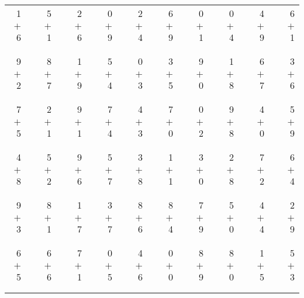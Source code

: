 \documentclass[12pt, letterpaper]{article}
\begin{document}
\begin{tabular}{rrrrrrrrrrrrrrrrrrr}
1 & & 5 & & 2 & & 0 & & 2 & & 6 & & 0 & & 0 & & 4 & & 6\\
$+$ 6 & & $+$ 1 & & $+$ 6 & & $+$ 9 & & $+$ 4 & & $+$ 9 & & $+$ 1 & & $+$ 4 & & $+$ 9 & & $+$ 1\\
\cline{1-1} \cline{3-3} \cline{5-5} \cline{7-7} \cline{9-9} \cline{11-11} \cline{13-13} \cline{15-15} \cline{17-17} \cline{19-19} \\ \\
9 & & 8 & & 1 & & 5 & & 0 & & 3 & & 9 & & 1 & & 6 & & 3\\
$+$ 2 & & $+$ 7 & & $+$ 9 & & $+$ 4 & & $+$ 3 & & $+$ 5 & & $+$ 0 & & $+$ 8 & & $+$ 7 & & $+$ 6\\
\cline{1-1} \cline{3-3} \cline{5-5} \cline{7-7} \cline{9-9} \cline{11-11} \cline{13-13} \cline{15-15} \cline{17-17} \cline{19-19} \\ \\
7 & & 2 & & 9 & & 7 & & 4 & & 7 & & 0 & & 9 & & 4 & & 5\\
$+$ 5 & & $+$ 1 & & $+$ 1 & & $+$ 4 & & $+$ 3 & & $+$ 0 & & $+$ 2 & & $+$ 8 & & $+$ 0 & & $+$ 9\\
\cline{1-1} \cline{3-3} \cline{5-5} \cline{7-7} \cline{9-9} \cline{11-11} \cline{13-13} \cline{15-15} \cline{17-17} \cline{19-19} \\ \\
4 & & 5 & & 9 & & 5 & & 3 & & 1 & & 3 & & 2 & & 7 & & 6\\
$+$ 8 & & $+$ 2 & & $+$ 6 & & $+$ 7 & & $+$ 8 & & $+$ 1 & & $+$ 0 & & $+$ 8 & & $+$ 2 & & $+$ 4\\
\cline{1-1} \cline{3-3} \cline{5-5} \cline{7-7} \cline{9-9} \cline{11-11} \cline{13-13} \cline{15-15} \cline{17-17} \cline{19-19} \\ \\
9 & & 8 & & 1 & & 3 & & 8 & & 8 & & 7 & & 5 & & 4 & & 2\\
$+$ 3 & & $+$ 1 & & $+$ 7 & & $+$ 7 & & $+$ 6 & & $+$ 4 & & $+$ 9 & & $+$ 0 & & $+$ 4 & & $+$ 9\\
\cline{1-1} \cline{3-3} \cline{5-5} \cline{7-7} \cline{9-9} \cline{11-11} \cline{13-13} \cline{15-15} \cline{17-17} \cline{19-19} \\ \\
6 & & 6 & & 7 & & 0 & & 4 & & 0 & & 8 & & 8 & & 1 & & 5\\
$+$ 5 & & $+$ 6 & & $+$ 1 & & $+$ 5 & & $+$ 6 & & $+$ 0 & & $+$ 9 & & $+$ 0 & & $+$ 5 & & $+$ 3\\
\cline{1-1} \cline{3-3} \cline{5-5} \cline{7-7} \cline{9-9} \cline{11-11} \cline{13-13} \cline{15-15} \cline{17-17} \cline{19-19} \\ \\

\end{tabular}
\end{document}

